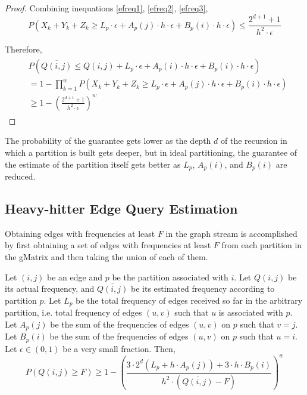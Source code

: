 \begin{proof}
Combining inequations \ref{efreq1}, \ref{efreq2}, \ref{efreq3},
\begin{equation} \label{efreq4}
  P(X_k + Y_k + Z_k \geq L_p \cdot \epsilon + A_p(j) \cdot h \cdot \epsilon + B_p(i) \cdot h \cdot \epsilon) \leq \frac{2^{d+1}+1}{h^2\cdot\epsilon}
\end{equation}

Therefore,
\begin{align}
\begin{split}
&  P(\overline{Q(i,j)} \leq Q(i,j) + L_p \cdot \epsilon + A_p(i) \cdot h \cdot \epsilon + B_p(i) \cdot h \cdot \epsilon)
\\  &= 1 - \prod _{k=1}^{w}P(X_k + Y_k + Z_k \geq L_p \cdot \epsilon + A_p(j) \cdot h \cdot \epsilon + B_p(i) \cdot h \cdot \epsilon)
\\  &\geq 1-(\frac{2^{d+1}+1}{h^2\cdot\epsilon})^w
\end{split}
\end{align}

\end{proof}

\begin{remarks}
  The probability of the guarantee gets lower as the depth $d$ of the recursion in which a partition is built gets deeper, but in ideal partitioning, the guarantee of the estimate of the partition itself gets better as $L_p$, $A_p(i)$, and $B_p(i)$ are reduced.
\end{remarks}


\subsection{Heavy-hitter Edge Query Estimation}
Obtaining edges with frequencies at least $F$ in the graph stream is accomplished by first obtaining a set of edges with frequencies at least $F$ from each partition in the gMatrix and then taking the union of each of them.

\begin{theorem}
Let $(i,j)$ be an edge and $p$ be the partition associated with $i$. Let $Q(i,j)$ be its actual frequency, and $\overline{Q(i,j)}$ be its estimated frequency according to partition $p$. Let $L_p$ be the total frequency of edges received so far in the arbitrary partition, i.e. total frequency of edges $(u,v)$ such that $u$ is associated with $p$. Let $A_p(j)$ be the sum of the frequencies of edges $(u,v)$ on $p$ such that $v=j$. Let $B_p(i)$ be the sum of the frequencies of edges $(u,v)$ on $p$ such that $u=i$. Let $\epsilon \in (0,1)$ be a very small fraction. Then,
\[
P(Q(i,j) \geq F) \geq 1-(\frac{3\cdot2^d(L_p+h\cdot A_p(j)) + 3\cdot h\cdot B_p(i)}{h^2\cdot (\overline{Q(i,j)}-F)})^w
\]
\end{theorem}

